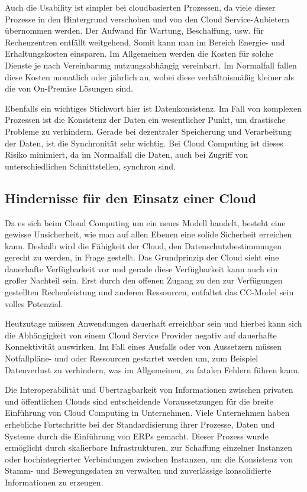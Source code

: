 Auch die Usability ist simpler bei cloudbasierten Prozessen, da viele dieser Prozesse in den Hintergrund verschoben und von den Cloud Service-Anbietern übernommen werden. Der Aufwand für Wartung, Beschaffung, usw. für Rechenzentren entfällt weitgehend. Somit kann man im Bereich Energie- und Erhaltungskosten einsparen. Im Allgemeinen werden die Kosten für solche Dienste je nach Vereinbarung nutzungsabhängig vereinbart. Im Normalfall fallen diese Kosten monatlich oder jährlich an, wobei diese verhältnismäßig kleiner als die von On-Premise Lösungen sind.

Ebenfalls ein wichtiges Stichwort hier ist Datenkonsistenz. Im Fall von komplexen Prozessen ist die Konsistenz der Daten ein wesentlicher Punkt, um drastische Probleme zu verhindern. Gerade bei dezentraler Speicherung und Verarbeitung der Daten, ist die Synchronität sehr wichtig. Bei Cloud Computing ist dieses Risiko minimiert, da im Normalfall die Daten, auch bei Zugriff von unterschiedlichen Schnittstellen, synchron sind.

\subsection{Hindernisse für den Einsatz einer Cloud}

Da es sich beim Cloud Computing um ein neues Modell handelt, besteht eine gewisse Unsicherheit, wie man auf allen Ebenen eine solide Sicherheit erreichen kann. Deshalb wird die Fähigkeit der Cloud, den Datenschutzbestimmungen gerecht zu werden, in Frage gestellt. Das Grundprinzip der Cloud sieht eine dauerhafte Verfügbarkeit vor und gerade diese Verfügbarkeit kann auch ein großer Nachteil sein. Erst durch den offenen Zugang zu den zur Verfügungen gestellten Rechenleistung und anderen Ressourcen, entfaltet das CC-Model sein volles Potenzial. 

Heutzutage müssen Anwendungen dauerhaft erreichbar sein und hierbei kann sich die Abhängigkeit von einem Cloud Service Provider negativ auf dauerhafte Konnektivität auswirken. Im Fall eines Ausfalls oder von Aussetzern müssen Notfallpläne- und oder Ressourcen gestartet werden um, zum Beispiel Datenverlust zu verhindern, was im Allgemeinen, zu fatalen Fehlern führen kann.

Die Interoperabilität und Übertragbarkeit von Informationen zwischen privaten und öffentlichen Clouds sind entscheidende Voraussetzungen für die breite Einführung von Cloud Computing in Unternehmen. Viele Unternehmen haben erhebliche Fortschritte bei der Standardisierung ihrer Prozesse, Daten und Systeme durch die Einführung von ERPs gemacht. Dieser Prozess wurde ermöglicht durch skalierbare Infrastrukturen, zur Schaffung einzelner Instanzen oder hochintegrierter Verbindungen zwischen Instanzen, um die Konsistenz von Stamm- und Bewegungsdaten zu verwalten und zuverlässige konsolidierte Informationen zu erzeugen.
